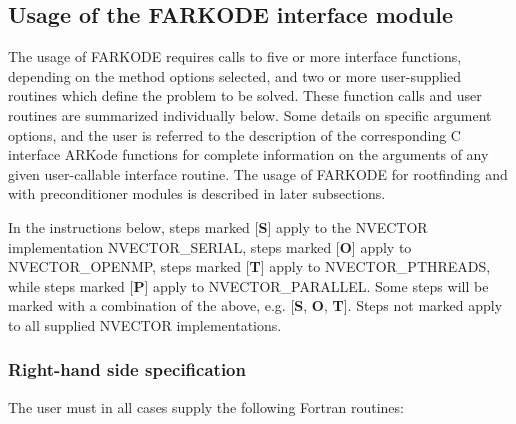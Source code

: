 \documentclass[letterpaper,10pt,english]{sphinxmanual}
\begin{document}
\subsection{Usage of the FARKODE interface module}
\label{f_interface/Usage:finterface-usage}\label{f_interface/Usage::doc}\label{f_interface/Usage:usage-of-the-farkode-interface-module}
The usage of FARKODE requires calls to five or more interface
functions, depending on the method options selected, and two or more
user-supplied routines which define the problem to be solved.  These
function calls and user routines are summarized individually below.
Some details on specific argument options, and the user is referred to
the description of the corresponding C interface ARKode functions for
complete information on the arguments of any given user-callable
interface routine.  The usage of FARKODE for rootfinding and with
preconditioner modules is described in later subsections.

In the instructions below, steps marked {[}\textbf{S}{]} apply to the NVECTOR
implementation NVECTOR\_SERIAL, steps marked {[}\textbf{O}{]} apply to
NVECTOR\_OPENMP, steps marked {[}\textbf{T}{]} apply to NVECTOR\_PTHREADS, while
steps marked {[}\textbf{P}{]} apply to NVECTOR\_PARALLEL.  Some steps will be
marked with a combination of the above, e.g.  {[}\textbf{S}, \textbf{O}, \textbf{T}{]}.
Steps not marked apply to all supplied NVECTOR implementations.


\subsubsection{Right-hand side specification}
\label{f_interface/Usage:right-hand-side-specification}\label{f_interface/Usage:finterface-rhs}
The user must in all cases supply the following Fortran routines:
\end{document}
